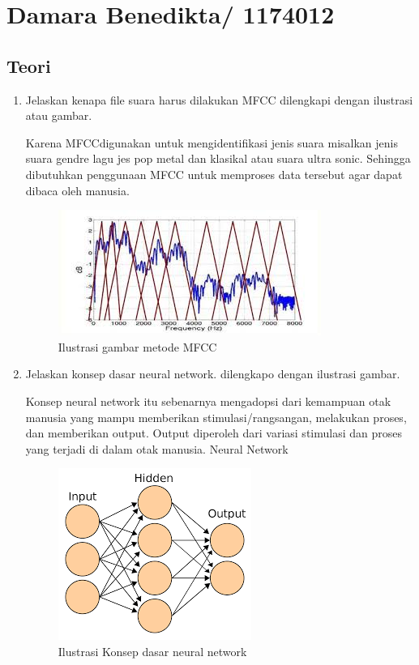 \section{Damara Benedikta/ 1174012}
\subsection{Teori}

\begin{enumerate}

\item Jelaskan kenapa file suara harus dilakukan MFCC dilengkapi dengan ilustrasi atau gambar.\par
Karena MFCCdigunakan untuk mengidentifikasi jenis suara misalkan jenis suara gendre lagu jes pop metal dan klasikal atau suara ultra sonic.
Sehingga dibutuhkan penggunaan MFCC untuk memproses data tersebut agar dapat dibaca oleh manusia.

\begin{figure}[ht]
\centering
\includegraphics[scale=0.5]{figures/1174012/chapter6/1,1.jpg}
\caption{Ilustrasi gambar metode MFCC}
\label{contoh}
\end{figure}


\item Jelaskan konsep dasar neural network. dilengkapo dengan ilustrasi gambar. \par
Konsep neural network itu sebenarnya mengadopsi dari kemampuan otak manusia yang mampu memberikan stimulasi/rangsangan, 
melakukan proses, dan memberikan output. Output diperoleh dari variasi stimulasi dan proses yang terjadi di dalam otak manusia.
Neural Network 

\begin{figure}[ht]
\centering
\includegraphics[scale=0.5]{figures/1174012/chapter6/1,2.png}
\caption{Ilustrasi Konsep dasar neural network}
\label{contoh}
\end{figure}



\end{enumerate}
